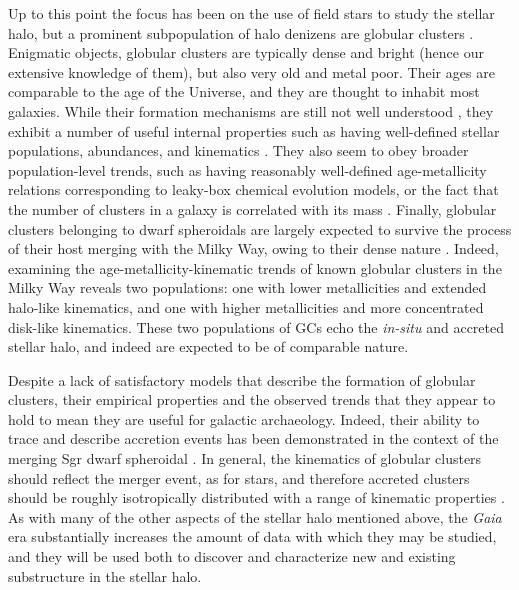 Up to this point the focus has been on the use of field stars to study the stellar halo, but a prominent subpopulation of halo denizens are globular clusters \parencite[for catalogues see][]{harris96,baumgardt18}. Enigmatic objects, globular clusters are typically dense and bright (hence our extensive knowledge of them), but also very old and metal poor. Their ages are comparable to the age of the Universe, and they are thought to inhabit most galaxies. While their formation mechanisms are still not well understood \parencite{forbes18a}, they exhibit a number of useful internal properties such as having well-defined stellar populations, abundances, and kinematics \parencite[although many also have multiple populations with slight differences,][]{milone22}. They also seem to obey broader population-level trends, such as having reasonably well-defined age-metallicity relations \parencite{forbes10,leaman13} corresponding to leaky-box chemical evolution models, or the fact that the number of clusters in a galaxy is correlated with its mass \parencite{harris13,forbes18b}. Finally, globular clusters belonging to dwarf spheroidals are largely expected to survive the process of their host merging with the Milky Way, owing to their dense nature \parencite{penarrubia09}. Indeed, examining the age-metallicity-kinematic trends of known globular clusters in the Milky Way reveals two populations: one with lower metallicities and extended halo-like kinematics, and one with higher metallicities and more concentrated disk-like kinematics. These two populations of GCs echo the \textit{in-situ} and accreted stellar halo, and indeed are expected to be of comparable nature.

Despite a lack of satisfactory models that describe the formation of globular clusters, their empirical properties and the observed trends that they appear to hold to mean they are useful for galactic archaeology. Indeed, their ability to trace and describe accretion events has been demonstrated in the context of the merging Sgr dwarf spheroidal \parencite{law10}. In general, the kinematics of globular clusters should reflect the merger event, as for stars, and therefore accreted clusters should be roughly isotropically distributed with a range of kinematic properties \parencite[linking back to the hypothesis of ][]{searle78}. As with many of the other aspects of the stellar halo mentioned above, the \textit{Gaia} era substantially increases the amount of data with which they may be studied, and they will be used both to discover and characterize new and existing substructure in the stellar halo.

